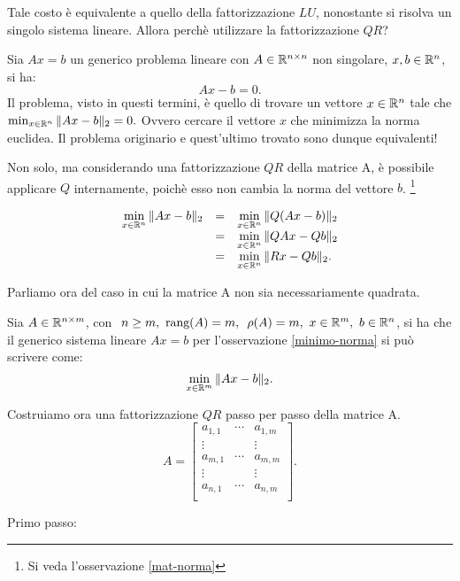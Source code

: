 \begin{flushleft}
Tale costo è equivalente a quello della fattorizzazione $LU$, nonostante si
risolva un singolo sistema lineare. Allora perchè utilizzare la
fattorizzazione $QR$?
\end{flushleft}

\begin{osse}
\label{minimo-norma}
Sia $Ax = b$ un generico problema lineare con $A \in  \mathbb{R}^{n \times n}$ non
singolare, $x,b \in \mathbb{R}^n$, si ha:
\[Ax -b = 0.\]
Il problema, visto in questi termini, è quello di trovare un vettore
$x \in \mathbb{R}^n$ tale che $\min_{x \in \mathbb{R}^n}\| Ax -b\|_2 = 0.$ Ovvero cercare il
vettore $x$ che minimizza la norma euclidea. Il problema originario e
quest'ultimo trovato sono dunque equivalenti!

Non solo, ma considerando una fattorizzazione $QR$ della matrice A, è possibile
applicare $Q$ internamente, poichè esso non cambia la norma del vettore $b$.
\footnote{Si veda l'osservazione \ref{mat-norma}}

\[
\begin{array}{lcl}
\displaystyle \min_{x \in \mathbb{R}^n}\|Ax - b \|_2 & = & \displaystyle \min_{x \in \mathbb{R}^n}\|Q(Ax-b)\|_2 \\
& = & \displaystyle \min_{x \in \mathbb{R}^n}\|QAx - Qb\|_2 \\
& = & \displaystyle \min_{x \in \mathbb{R}^n}\|Rx - Qb\|_2.
\end{array}
\]
\end{osse}

Parliamo ora del caso in cui la matrice A non sia necessariamente quadrata.

Sia $A \in \mathbb{R}^{n \times m}$, con $\ n \geq m, \ \textrm{rang}(A) = m,
\ \,\rho(A)=m, \ x \in \mathbb{R}^m,\ b \in \mathbb{R}^n$, si ha che il generico sistema
lineare $Ax = b$ per l'osservazione \ref{minimo-norma} si può scrivere come:
\[\min_{x \in \mathbb{R}^m}\|Ax -b\|_2.\]

Costruiamo ora una fattorizzazione $QR$ passo per passo della matrice A.
\[
A = \left[
\begin{array}{ccccc}
a_{1,1} & \cdots & a_{1,m} \\
\vdots &        & \vdots \\
a_{m,1} & \cdots & a_{m,m} \\
\vdots &        & \vdots \\
a_{n,1} & \cdots & a_{n,m} \\
\end{array}
\right].
\]

Primo passo:

